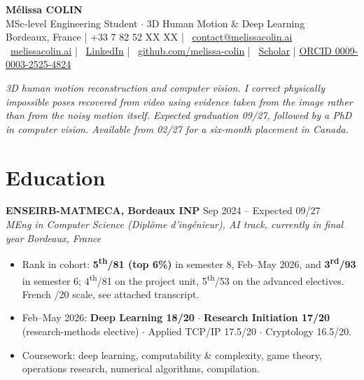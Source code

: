 \documentclass[10pt, letterpaper]{article}
\newcommand{\entry}[4]{%
  \noindent \textbf{#1} \hfill #2 \\
  \textit{#3} \hfill \textit{#4} \par
}
\providecommand{\myphone}{+33 7 82 52 XX XX}
\begin{document}
\begin{center}
    {\fontsize{21}{21}\selectfont \textbf{Mélissa COLIN}} \\[4pt]
    {\large MSc-level Engineering Student $\cdot$ 3D Human Motion \& Deep Learning} \\[4pt]

    \small{
    \faMapMarker* Bordeaux, France \quad|\quad
    \faPhone* \myphone{} \quad|\quad
    \faEnvelope~\href{mailto:contact@melissacolin.ai}{contact@melissacolin.ai} \\
    \faGlobe~\href{https://melissacolin.ai}{melissacolin.ai} \quad|\quad
    \faLinkedin~\href{https://www.linkedin.com/in/melissacolin/}{LinkedIn} \quad|\quad
    \faGithub~\href{https://github.com/melissa-colin}{github.com/melissa-colin} \quad|\quad
    \faGraduationCap~\href{https://scholar.google.com/citations?user=7r7iFpsAAAAJ}{Scholar} \quad|\quad
    \href{https://orcid.org/0009-0003-2525-4824}{ORCID 0009-0003-2525-4824}
    }
\end{center}

\vspace{2pt}

{\small \textit{3D human motion reconstruction and computer vision. I correct physically
impossible poses recovered from video using evidence taken from the image rather than from
the noisy motion itself. Expected graduation 09/27, followed by a PhD in computer vision.
Available from 02/27 for a six-month placement in Canada.}}

\section{Education}

\entry{ENSEIRB-MATMECA, Bordeaux INP}{Sep 2024 -- Expected 09/27}%
{MEng in Computer Science (\textit{Diplôme d'ingénieur}), AI track, currently in final year}{Bordeaux, France}
\begin{itemize}
    \item Rank in cohort: \textbf{5\textsuperscript{th}/81 (top 6\%)} in semester 8, Feb--May 2026, and \textbf{3\textsuperscript{rd}/93} in semester 6; 4\textsuperscript{th}/81 on the project unit, 5\textsuperscript{th}/53 on the advanced electives. French /20 scale, see attached transcript.
    \item Feb--May 2026: \textbf{Deep Learning 18/20} $\cdot$ \textbf{Research Initiation 17/20} (research-methods elective) $\cdot$ Applied TCP/IP 17.5/20 $\cdot$ Cryptology 16.5/20.
    \item Coursework: deep learning, computability \& complexity, game theory, operations research, numerical algorithms, compilation.
\end{itemize}
\end{document}
